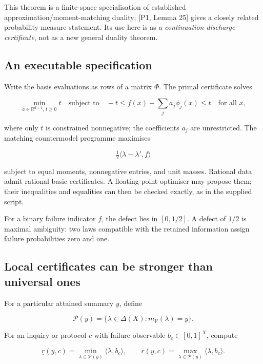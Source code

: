 \documentclass[11pt,a4paper]{article}
\begin{document}
This theorem is a finite-space specialisation of established
approximation/moment-matching duality; {[}P1, Lemma 25{]} gives a
closely related probability-measure statement. Its use here is as a
\emph{continuation-discharge certificate}, not as a new general duality
theorem.

\subsection{An executable
specification}\label{an-executable-specification}

Write the basis evaluations as rows of a matrix \(\Phi\). The primal
certificate solves

\nopagebreak[4]

\[
\min_{a\in\mathbb R^{d+1},\,t\ge0}t\quad\text{subject to}\quad
-t\le f(x)-\sum_ja_j\phi_j(x)\le t\quad\text{for all }x,
\]

where only \(t\) is constrained nonnegative; the coefficients \(a_j\)
are unrestricted. The matching countermodel programme maximises

\nopagebreak[4]

\[
\tfrac12\langle\lambda-\lambda',f\rangle
\]

subject to equal moments, nonnegative entries, and unit masses. Rational
data admit rational basic certificates. A floating-point optimiser may
propose them; their inequalities and equalities can then be checked
exactly, as in the supplied script.

For a binary failure indicator \(f\), the defect lies in \([0,1/2]\). A
defect of \(1/2\) is maximal ambiguity: two laws compatible with the
retained information assign failure probabilities zero and one.

\subsection{Local certificates can be stronger than universal
ones}\label{local-certificates-can-be-stronger-than-universal-ones}

For a particular attained summary \(y\), define

\nopagebreak[4]

\[
\mathcal P(y)=\{\lambda\in\Delta(X):m_{\mathscr V}(\lambda)=y\}.
\]

For an inquiry or protocol \(c\) with failure observable
\(b_c\in[0,1]^X\), compute

\nopagebreak[4]

\[
\underline r(y,c)=\min_{\lambda\in\mathcal P(y)}\langle\lambda,b_c\rangle,
\qquad
\overline r(y,c)=\max_{\lambda\in\mathcal P(y)}\langle\lambda,b_c\rangle.
\]
\end{document}
